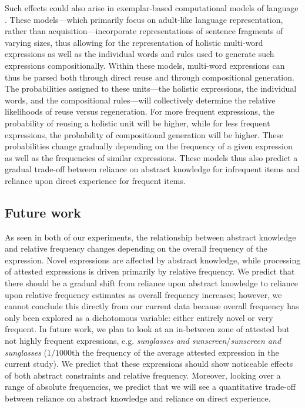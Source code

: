 \documentclass[authoryear]{elsarticle}
\begin{document}
Such effects could also arise in exemplar-based computational models of language \citep[e.g.][]{Bod:1998tx,Bod:2003uw, Bod:2008uc, Johnson:2007wl, Demberg:2010tf, ODonnell:2011vh}. These models---which primarily focus on adult-like language representation, rather than acquisition---incorporate representations of sentence fragments of varying sizes, thus allowing for the representation of holistic multi-word expressions as well as the individual words and rules used to generate such expressions compositionally. Within these models, multi-word expressions can thus be parsed both through direct reuse and through compositional generation. The probabilities assigned to these units---the holistic expressions, the individual words, and the compositional rules---will collectively determine the relative likelihoods of reuse versus regeneration. For more frequent expressions, the probability of reusing a holistic unit will be higher, while for less frequent expressions, the probability of compositional generation will be higher. These probabilities change gradually depending on the frequency of a given expression as well as the frequencies of similar expressions. These models thus also predict a gradual trade-off between reliance on abstract knowledge for infrequent items and reliance upon direct experience for frequent items.


\subsection{Future work}
 As seen in both of our experiments, the relationship between abstract knowledge and relative frequency changes depending on the overall frequency of the expression. Novel expressions are affected by abstract knowledge, while processing of attested expressions is driven primarily by relative frequency. We predict that there should be a gradual shift from reliance upon abstract knowledge to reliance upon relative frequency estimates as overall frequency increases; however, we cannot conclude this directly from our current data because overall frequency has only been explored as a dichotomous variable: either entirely novel or very frequent. In future work, we plan to look at an in-between zone of attested but not highly frequent expressions, e.g. \emph{sunglasses and sunscreen}/\emph{sunscreen and sunglasses} ($1/1000$th the frequency of the average attested expression in the current study). We predict that these expressions should show noticeable effects of both abstract constraints and relative frequency. Moreover, looking over a range of absolute frequencies, we predict that we will see a quantitative trade-off between reliance on abstract knowledge and reliance on direct experience. 
\end{document}
